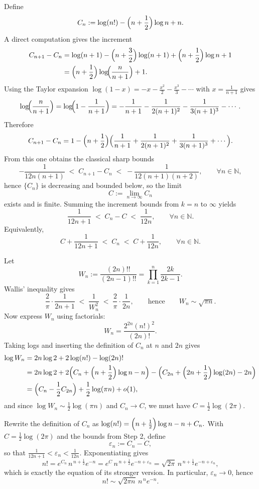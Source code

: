 \documentclass[letterpaper]{article}
\begin{document}
			
			Define
			\[
			C_n:=\log(n!) -\Bigl(n+\frac12\Bigr)\log n + n.
			\]
			A direct computation gives the increment
			\begin{align*}
				C_{n+1}-C_n
				&=\log(n+1)-\Bigl(n+\frac32\Bigr)\log(n+1)+\Bigl(n+\frac12\Bigr)\log n+1 \\
				&=\Bigl(n+\frac12\Bigr)\log\!\Bigl(\frac{n}{n+1}\Bigr)+1.
			\end{align*}
			Using the Taylor expansion $\log(1-x)=-x-\frac{x^2}{2}-\frac{x^3}{3}-\cdots$ with
			$x=\frac{1}{n+1}$ gives
			\[
			\log\!\Bigl(\frac{n}{n+1}\Bigr)=\log\!\Bigl(1-\frac{1}{n+1}\Bigr)
			=-\frac{1}{n+1}-\frac{1}{2(n+1)^2}-\frac{1}{3(n+1)^3}-\cdots .
			\]
			Therefore
			\[
			C_{n+1}-C_n
			=1-\Bigl(n+\frac12\Bigr)\Bigl(\frac{1}{n+1}+\frac{1}{2(n+1)^2}+\frac{1}{3(n+1)^3}+\cdots\Bigr).
			\]
			From this one obtains the classical sharp bounds
			\[
			-\frac{1}{12n(n+1)} \;<\; C_{n+1}-C_n \;<\; -\frac{1}{12(n+1)(n+2)},
			\qquad \forall n\in\mathbb{N},
			\]
			hence $\{C_n\}$ is decreasing and bounded below, so the limit
			\[
			C:=\lim_{n\to\infty} C_n
			\]
			exists and is finite. Summing the increment bounds from $k=n$ to $\infty$ yields
			\[
			\frac{1}{12n+1} \;<\; C_n-C \;<\; \frac{1}{12n},
			\qquad \forall n\in\mathbb{N}.
			\]
			Equivalently,
			\[
			C+\frac{1}{12n+1} \;<\; C_n \;<\; C+\frac{1}{12n},
			\qquad \forall n\in\mathbb{N}.
			\]
			
			
			Let
			\[
			W_n:=\frac{(2n)!!}{(2n-1)!!}=\prod_{k=1}^n\frac{2k}{2k-1}.
			\]
			Wallis' inequality gives
			\[
			\frac{2}{\pi}\cdot\frac{1}{2n+1} \;<\; \frac{1}{W_n^2} \;<\; \frac{2}{\pi}\cdot\frac{1}{2n},
			\qquad \text{hence}\qquad
			W_n\sim \sqrt{\pi n}.
			\]
			Now express $W_n$ using factorials:
			\[
			W_n=\frac{2^{2n}(n!)^2}{(2n)!}.
			\]
			Taking logs and inserting the definition of $C_n$ at $n$ and $2n$ gives
			\begin{align*}
				\log W_n
				&=2n\log 2 +2\log(n!) -\log(2n)! \\
				&=2n\log 2 +2\Bigl(C_n+\Bigl(n+\frac12\Bigr)\log n-n\Bigr)
				-\Bigl(C_{2n}+\Bigl(2n+\frac12\Bigr)\log(2n)-2n\Bigr) \\
				&=\Bigl(C_n-\frac12 C_{2n}\Bigr) +\frac12\log(\pi n) + o(1),
			\end{align*}
			and since $\log W_n\sim \frac12\log(\pi n)$ and $C_n\to C$, we must have
			$C=\frac12\log(2\pi)$.
			
			
			Rewrite the definition of $C_n$ as $
			\log(n!)=\Bigl(n+\frac12\Bigr)\log n - n + C_n.$
			With $C=\frac12\log(2\pi)$ and the bounds from Step 2, define
			\[
			\varepsilon_n:=C_n-C,
			\]
			so that $\frac{1}{12n+1}<\varepsilon_n<\frac{1}{12n}$. Exponentiating gives
			\[
			n!=e^{C_n}\, n^{\,n+\frac12}e^{-n}
			=e^{C}\,n^{\,n+\frac12}e^{-n+\varepsilon_n}
			=\sqrt{2\pi}\,n^{\,n+\frac12}e^{-n+\varepsilon_n},
			\]
			which is exactly the equation of its stronger version. In particular, $\varepsilon_n\to 0$, hence
			\[
			n!\sim \sqrt{2\pi n}\,n^{\,n}e^{-n}.
			\]
		
\end{document}
